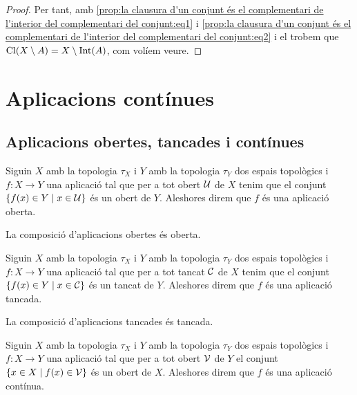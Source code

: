 \documentclass[../../Main.tex]{subfiles}
\begin{document}
\begin{proposition}
\begin{proof}
			Per tant, amb \eqref{prop:la clausura d'un conjunt és el complementari de l'interior del complementari del conjunt:eq1} i \eqref{prop:la clausura d'un conjunt és el complementari de l'interior del complementari del conjunt:eq2} i el  trobem que \(\operatorname{Cl}(X\setminus A)=X\setminus\operatorname{Int}(A)\), com volíem veure.
		\end{proof}
	\end{proposition}
\section{Aplicacions contínues}
	\subsection{Aplicacions obertes, tancades i contínues}
	\begin{definition}
		\label{def:aplicació oberta}
		Siguin \(X\) amb la topologia \(\tau_{X}\) i \(Y\) amb la topologia \(\tau_{Y}\) dos espais topològics i \(f\colon X\longrightarrow Y\) una aplicació tal que per a tot obert \(\mathcal{U}\) de \(X\) tenim que el conjunt \(\{f(x)\in Y\mid x\in\mathcal{U}\}\) és un obert de \(Y\). Aleshores direm que \(f\) és una aplicació oberta.
	\end{definition}
	\begin{observation}
		\label{obs:la composició d'aplicacions obertes és oberta}
		La composició d'aplicacions obertes és oberta.
	\end{observation}
	\begin{definition}
		\label{def:aplicació tancada}
		Siguin \(X\) amb la topologia \(\tau_{X}\) i \(Y\) amb la topologia \(\tau_{Y}\) dos espais topològics i \(f\colon X\longrightarrow Y\) una aplicació tal que per a tot tancat \(\mathcal{C}\) de \(X\) tenim que el conjunt \(\{f(x)\in Y\mid x\in\mathcal{C}\}\) és un tancat de \(Y\). Aleshores direm que \(f\) és una aplicació tancada.
	\end{definition}
	\begin{observation}
		\label{obs:la composició d'aplicacions tancades és tancada}
		La composició d'aplicacions tancades és tancada.
	\end{observation}
	\begin{definition}
		\label{def:aplicació contínua}
		Siguin \(X\) amb la topologia \(\tau_{X}\) i \(Y\) amb la topologia \(\tau_{Y}\) dos espais topològics i \(f\colon X\longrightarrow Y\) una aplicació tal que per a tot obert \(\mathcal{V}\) de \(Y\) el conjunt \(\{x\in X\mid f(x)\in\mathcal{V}\}\) és un obert de \(X\). Aleshores direm que \(f\) és una aplicació contínua.
	\end{definition}
\end{document}
